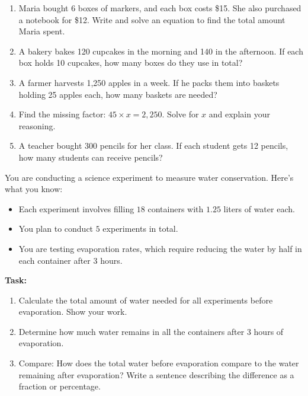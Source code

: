 \documentclass[12pt]{article}
\begin{document}
\begin{tcolorbox}[colframe=black!60, colback=white, 
coltitle=black, colbacktitle=black!15, fonttitle=\bfseries\Large, 
title=Problems, halign title=center, left=10pt, right=10pt, top=10pt, bottom=100pt]
\begin{enumerate}[start=9, itemsep=5em]
    \item Maria bought 6 boxes of markers, and each box costs \$15. She also purchased a notebook for \$12. Write and solve an equation to find the total amount Maria spent.
    \item A bakery bakes 120 cupcakes in the morning and 140 in the afternoon. If each box holds 10 cupcakes, how many boxes do they use in total?
    \item A farmer harvests 1,250 apples in a week. If he packs them into baskets holding 25 apples each, how many baskets are needed?
   \item Find the missing factor: \( 45 \times x = 2,250 \). Solve for \( x \) and explain your reasoning.
    \item A teacher bought 300 pencils for her class. If each student gets 12 pencils, how many students can receive pencils?
\end{enumerate}
\end{tcolorbox}

\vspace{1em}

\begin{tcolorbox}[colframe=black!60, colback=white, 
coltitle=black, colbacktitle=black!15, fonttitle=\bfseries\Large, 
title=Performance Task: Designing a Water Conservation Experiment, halign title=center, left=10pt, right=10pt, top=10pt, bottom=50pt]
You are conducting a science experiment to measure water conservation. Here’s what you know:
\begin{itemize}
    \item Each experiment involves filling \( 18 \) containers with \( 1.25 \) liters of water each.
    \item You plan to conduct \( 5 \) experiments in total.
    \item You are testing evaporation rates, which require reducing the water by half in each container after 3 hours.
\end{itemize}
\textbf{Task:}
\begin{enumerate}[itemsep=3em]
    \item Calculate the total amount of water needed for all experiments before evaporation. Show your work.
    \item Determine how much water remains in all the containers after 3 hours of evaporation.
    \item Compare: How does the total water before evaporation compare to the water remaining after evaporation? Write a sentence describing the difference as a fraction or percentage.
\vspace{1cm}
\end{enumerate}
\end{tcolorbox}
\end{document}
